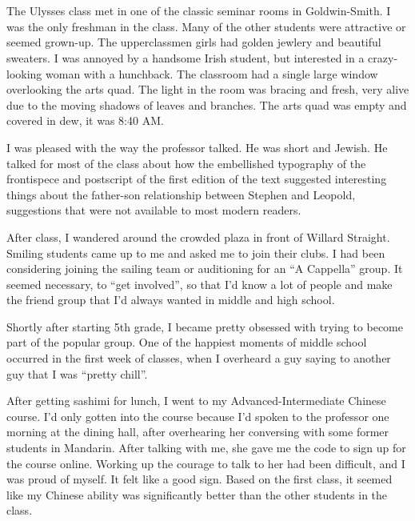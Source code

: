 \section{}

The Ulysses class met in one of the classic seminar rooms in Goldwin-Smith.  I
was the only freshman in the class.  Many of the other students were attractive
or seemed grown-up.  The upperclassmen girls had golden jewlery and beautiful
sweaters.  I was annoyed by a handsome Irish student, but interested in a
crazy-looking woman with a hunchback.  The classroom had a single large window
overlooking the arts quad.  The light in the room was bracing and fresh, very
alive due to the moving shadows of leaves and branches.  The arts quad was empty
and covered in dew, it was 8:40 AM.

I was pleased with the way the professor talked.  He was short and Jewish.  He
talked for most of the class about how the embellished typography of the
frontispece and postscript of the first edition of the text suggested
interesting things about the father-son relationship between Stephen and
Leopold, suggestions that were not available to most modern readers.

After class, I wandered around the crowded plaza in front of Willard Straight.
Smiling students came up to me and asked me to join their clubs.  I had been
considering joining the sailing team or auditioning for an ``A Cappella'' group.
It seemed necessary, to ``get involved'', so that I'd know a lot of people and
make the friend group that I'd always wanted in middle and high school.  

Shortly after starting 5th grade, I became pretty obsessed with trying to become
part of the popular group.  One of the happiest moments of middle school
occurred in the first week of classes, when I overheard a guy saying to another
guy that I was ``pretty chill''. 

After getting sashimi for lunch, I went to my Advanced-Intermediate Chinese
course.   I'd only gotten into the course because I'd spoken to the professor
one morning at the dining hall, after overhearing her conversing with some
former students in Mandarin.  After talking with me, she gave me the code to
sign up for the course online.  Working up the courage to talk to her had been
difficult, and I was proud of myself.  It felt like a good sign. Based on the
first class, it seemed like my Chinese ability was significantly better than the
other students in the class.

\section{}

